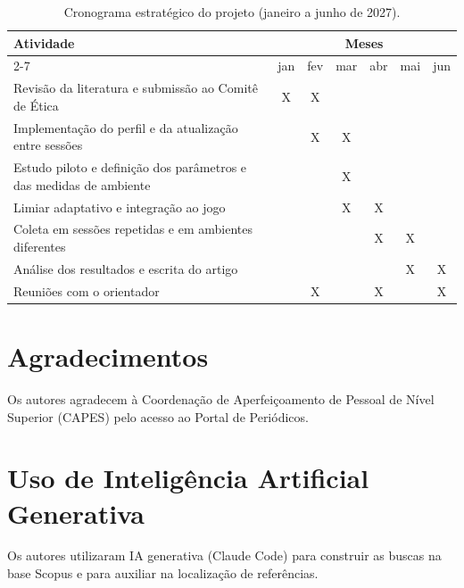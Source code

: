 \documentclass[runningheads]{llncs}
\begin{document}
\begin{table}[htb]
\centering
\caption{Cronograma estratégico do projeto (janeiro a junho de 2027).}
\label{tab:cronograma}
\scriptsize
\begin{tabular}{@{}l c c c c c c@{}}
\toprule
\multirow{2}{*}{\textbf{Atividade}} & \multicolumn{6}{c}{\textbf{Meses}} \\
\cmidrule(l){2-7}
 & jan & fev & mar & abr & mai & jun \\
\midrule
Revisão da literatura e submissão ao Comitê de Ética & X & X & & & & \\
Implementação do perfil e da atualização entre sessões & & X & X & & & \\
Estudo piloto e definição dos parâmetros e das medidas de ambiente & & & X & & & \\
Limiar adaptativo e integração ao jogo & & & X & X & & \\
Coleta em sessões repetidas e em ambientes diferentes & & & & X & X & \\
Análise dos resultados e escrita do artigo & & & & & X & X \\
Reuniões com o orientador & & X & & X & & X \\
\bottomrule
\end{tabular}
\end{table}

\section*{Agradecimentos}

Os autores agradecem à Coordenação de Aperfeiçoamento de Pessoal de Nível Superior (CAPES) pelo acesso ao Portal de Periódicos.




\section*{Uso de Inteligência Artificial Generativa}

Os autores utilizaram IA generativa (Claude Code) para construir as buscas na base Scopus e para auxiliar na localização de referências.
\end{document}
